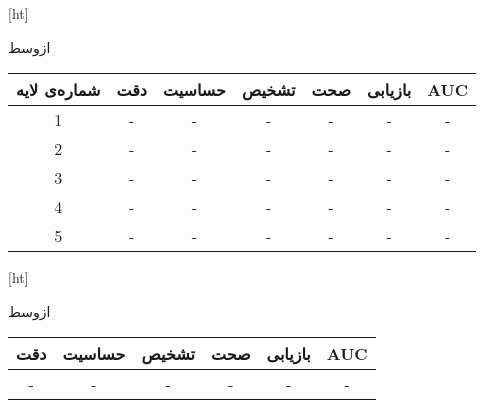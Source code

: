 [ht]

\vspace{1.5em}

‌ازوسط

\begin{tabular}{|c|c|c|c|c|c|c|}
    \hline
    \rowcolor[HTML]{EFEFEF} 
    \cellcolor[HTML]{EFEFEF}شماره‌ی لایه & \cellcolor[HTML]{EFEFEF}دقت & حساسیت & تشخیص & صحت & بازیابی & AUC \\ \hline
    1                                    & -                           & -      & -     & -   & -       & -   \\ \hline
    2                                    & -                           & -      & -     & -   & -       & -   \\ \hline
    3                                    & -                           & -      & -     & -   & -       & -   \\ \hline
    4                                    & -                           & -      & -     & -   & -       & -   \\ \hline
    5                                    & -                           & -      & -     & -   & -       & -   \\ \hline
    \end{tabular}


[ht]

\vspace{1.5em}

‌ازوسط

\begin{tabular}{|c|c|c|c|c|c|}
    \hline
    \rowcolor[HTML]{EFEFEF} 
    \cellcolor[HTML]{EFEFEF}دقت & حساسیت & تشخیص & صحت & بازیابی & AUC \\ \hline
    -                           & -      & -     & -   & -       & -   \\ \hline
    \end{tabular}

